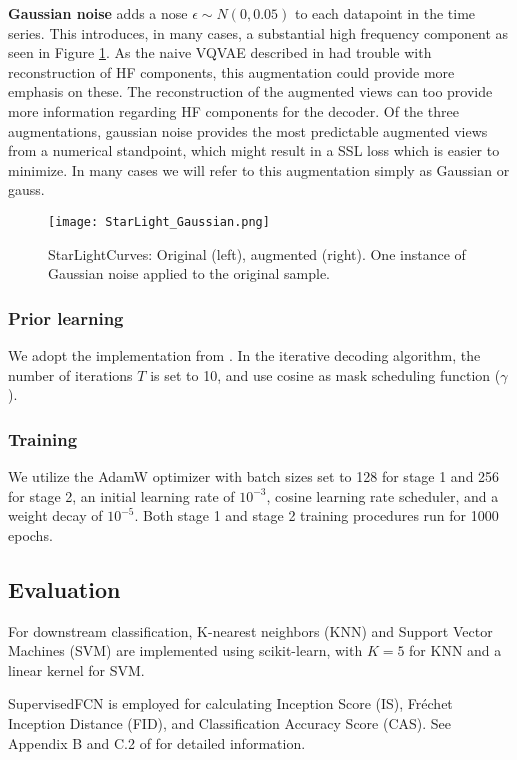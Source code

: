 \documentclass[../../thesis.tex]{subfiles}
\begin{document}
\textbf{Gaussian noise} adds a nose $\epsilon \sim N(0,0.05)$ to each datapoint in the time series. This introduces, in many cases, a substantial high frequency component as seen in Figure \ref{fig:StarLight_Gaussian}. As the naive VQVAE described in \cite{TimeVQVAE} had trouble with reconstruction of HF components, this augmentation could provide more emphasis on these. The reconstruction of the augmented views can too provide more information regarding HF components for the decoder. Of the three augmentations, gaussian noise provides the most predictable augmented views from a numerical standpoint, which might result in a SSL loss which is easier to minimize. In many cases we will refer to this augmentation simply as Gaussian or gauss.
\begin{figure}[h]
    \texttt{[image: StarLight\_Gaussian.png]}
    \centering
    \caption{StarLightCurves: Original (left), augmented (right). One instance of Gaussian noise applied to the original sample.}
    \label{fig:StarLight_Gaussian}
\end{figure}



\subsubsection{Prior learning}
We adopt the implementation from \cite{chang2022maskgit}. In the iterative decoding algorithm, the number of iterations $T$ is set to 10, and use cosine as mask scheduling function ($\gamma$). 

\subsubsection{Training}
We utilize the AdamW optimizer with batch sizes set to 128 for stage 1 and 256 for stage 2, an initial learning rate of $10^{-3}$, cosine learning rate scheduler, and a weight decay of $10^{-5}$. Both stage 1 and stage 2 training procedures run for 1000 epochs.


\subsection{Evaluation}
For downstream classification, K-nearest neighbors (KNN) and Support Vector Machines (SVM) are implemented using scikit-learn, with $K=5$ for KNN and a linear kernel for SVM. \newline

SupervisedFCN is employed for calculating Inception Score (IS), Fréchet Inception Distance (FID), and Classification Accuracy Score (CAS). See Appendix B and C.2 of \cite{VQVAE} for detailed information.
\end{document}
